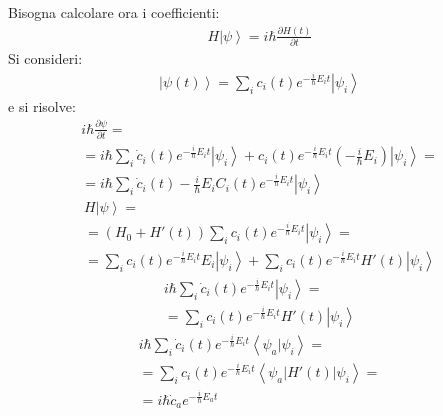 Bisogna calcolare ora i coefficienti:
\begin{equation}\begin{split}
H\left |\psi  \right\rangle=i\hbar \frac{\partial H\left(t\right)}{\partial t}
\end{split}\end{equation}
Si consideri:
\begin{equation}\begin{split}
\left |\psi \left(t\right) \right\rangle=\sum_i{c_i\left(t\right)e^{-\frac{i}{\hbar }E_it}\left |\psi _i \right\rangle}
\end{split}\end{equation}
e si risolve:
\begin{equation}\begin{split}
i\hbar \frac{\partial \psi }{\partial t}=\\
=i\hbar \sum_i{\dot c_i\left(t\right)e^{-\frac{i}{\hbar }E_it}\left |\psi _i \right\rangle+c_i\left(t\right)e^{-\frac{i}{\hbar }E_it}\left(-\frac{i}{\hbar }E_i\right)\left |\psi _i \right\rangle}=\\
=i\hbar \sum_i{\dot c_i\left(t\right)-\frac{i}{\hbar }E_iC_i\left(t\right)}e^{-\frac{i}{\hbar }E_it}\left |\psi _i \right\rangle
\end{split}\end{equation}
\begin{equation}\begin{split}
H\left |\psi  \right\rangle=\\
=\left(H_0+H'\left(t\right)\right)\sum_i{c_i\left(t\right)e^{-\frac{i}{\hbar }E_it}\left |\psi _i \right\rangle}=\\
=\sum_i{c_i\left(t\right)e^{-\frac{i}{\hbar }E_it}E_i\left |\psi _i \right\rangle}+\sum_i{c_i\left(t\right)e^{-\frac{i}{\hbar }E_it}H'\left(t\right)\left |\psi _i \right\rangle}
\end{split}\end{equation}
\begin{equation}\begin{split}
i\hbar \sum_i{\dot c_i\left(t\right)e^{-\frac{i}{\hbar }E_it}\left |\psi _i \right\rangle}=\\
=\sum_i{c_i\left(t\right)e^{-\frac{i}{\hbar }E_it}H'\left(t\right)\left |\psi _i \right\rangle}
\end{split}\end{equation}
\begin{equation}\begin{split}
i\hbar \sum_i{\dot c_i\left(t\right)e^{-\frac{i}{\hbar }E_it}\left\langle \psi _a|\psi _i \right\rangle}=\\
=\sum_i{c_i\left(t\right)e^{-\frac{i}{\hbar }E_it}\left\langle \psi _a|H'\left(t\right)|\psi _i \right\rangle}=\\
=i\hbar \dot c_ae^{-\frac{i}{\hbar }E_at}
\end{split}\end{equation}
